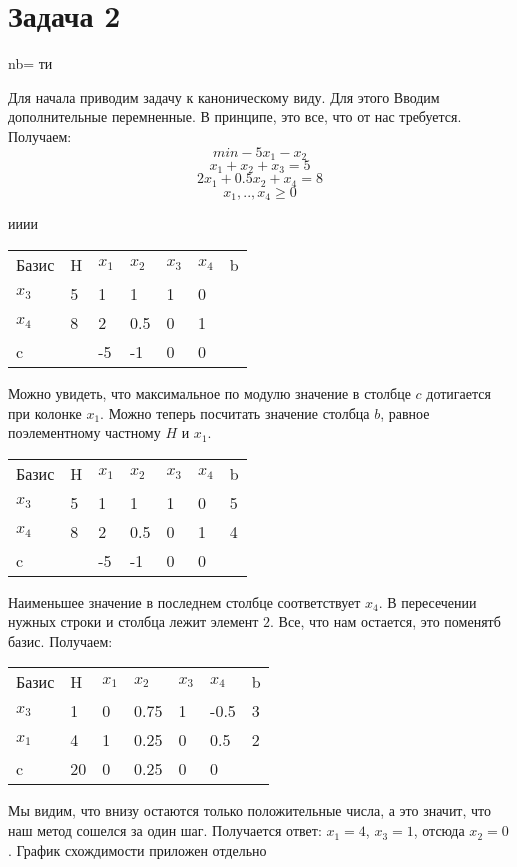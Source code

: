 \documentclass[tikz]{article}
\begin{document}
\section{Задача 2}
nb=
ти

Для начала приводим задачу к каноническому виду. Для этого Вводим дополнительные перемненные.
В принципе, это все, что от нас требуется. Получаем:
$$ min -5x_1 - x_2$$
$$ x_1 + x_2 + x_3 = 5$$
$$ 2x_1 + 0.5x_2 + x_4 = 8$$
$$ x_1, .. , x_4 \geq 0 $$

ииии

\begin{tabular}{|l|l|l|l|l|l|l|}
\hline
Базис & H & $x_1$ & $x_2$ & $x_3$ & $x_4$ & b \\
$x_3$ & 5 & 1     & 1     & 1     & 0     &  \\
$x_4$ & 8 & 2     & 0.5   & 0     & 1     &  \\
c     &   & -5    & -1    & 0     & 0     &  \\
\hline
\end{tabular}

Можно увидеть, что максимальное по модулю значение в столбце $c$ дотигается при колонке $x_1$. Можно теперь посчитать значение столбца $b$, равное поэлементному частному $H$ и 
$x_1$. 

\begin{tabular}{|l|l|l|l|l|l|l|}
\hline
Базис & H & $x_1$ & $x_2$ & $x_3$ & $x_4$ & b \\
$x_3$ & 5 & 1     & 1     & 1     & 0     &  5\\
$x_4$ & 8 & 2     & 0.5   & 0     & 1     &  4\\
c     &   & -5    & -1    & 0     & 0     &  \\
\hline
\end{tabular}

Наименьшее значение в последнем столбце соответствует $x_4$. В пересечении нужных строки и столбца лежит элемент $2$. Все, что нам остается, это поменятб базис. Получаем:

\begin{tabular}{|l|l|l|l|l|l|l|}
\hline
Базис & H & $x_1$ & $x_2$ & $x_3$ & $x_4$ & b \\
$x_3$ & 1 & 0     & 0.75     & 1     & -0.5     &  3\\
$x_1$ & 4 & 1     & 0.25   & 0     & 0.5     &  2\\
c     & 20 & 0 & 0.25  & 0     & 0     &  \\
\hline
\end{tabular}

Мы видим, что внизу остаются только положительные числа, а это значит, что наш метод сошелся за один шаг.  Получается ответ: $x_1 = 4$, $x_3 = 1$, отсюда $x_2 = 0$. 
График схождимости приложен отдельно
\end{document}
